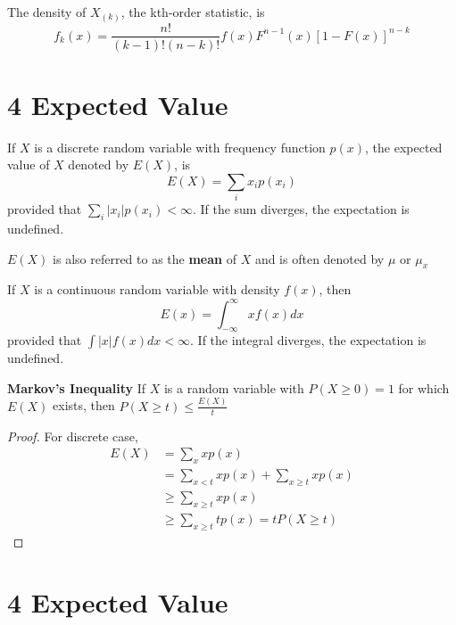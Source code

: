 \documentclass[11pt]{article}
\begin{document}
\begin{defn*}
  The density of $X_{(k)}$, the kth-order statistic, is
  \[
    f_k(x)=  \frac{n!}{(k-1)!(n-k)!} f(x) F^{n-1}(x)[1- F(x)]^{n-k}
  \]
\end{defn*}

\section*{4 Expected Value}

\begin{defn*}
  If $X$ is a discrete random variable with frequency function $p(x)$, the expected value of $X$ denoted by $E(X)$, is
  \[
    E(X) = \sum_{i} x_i p(x_i)
  \]
  provided that $\sum_{i} |x_i| p(x_i) < \infty$. If the sum diverges, the expectation is undefined.
  \begin{rem}
    $E(X)$ is also referred to as the \textbf{mean} of $X$ and is often denoted by $\mu$ or $\mu_x$
  \end{rem}
\end{defn*}

\begin{defn*}
  If $X$ is a continuous random variable with density $f(x)$, then
  \[
    E(x) = \int_{-\infty}^{\infty} xf(x) dx
  \]
  provided that $\int  |x|f(x)dx < \infty$. If the integral diverges, the expectation is undefined.
\end{defn*}


\begin{theorem*}
  \textbf{Markov's Inequality} If $X$ is a random variable with $P(X\geq0)= 1$ for which $E(X)$ exists, then $P(X\geq t) \leq \frac{E(X)}{t}$
  \begin{proof}
    For discrete case,
    \begin{align*}
      E(X) &= \sum_{x} xp(x) \\
      &= \sum_{x<t} xp(x) + \sum_{x\geq t} xp(x) \\
      &\geq \sum_{x\geq t} xp(x) \tag{because all the sums are nonnegative} \\
      &\geq \sum_{x\geq t} tp(x) = tP(X\geq t)
    \end{align*}
  \end{proof}
\end{theorem*}

\section{4 Expected Value}
\end{document}
